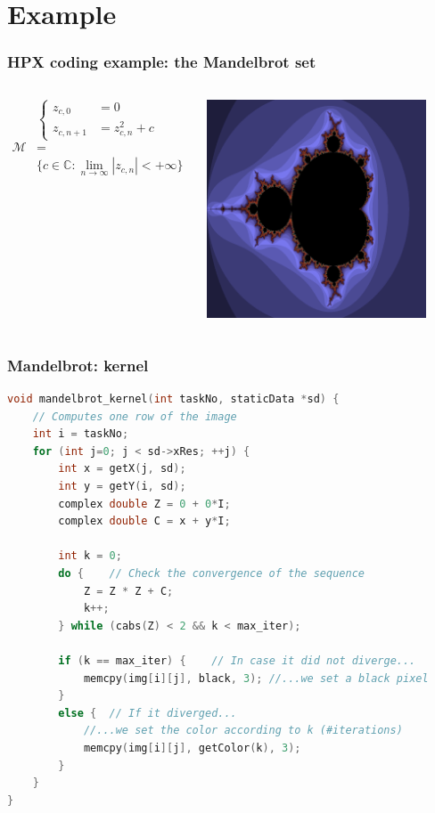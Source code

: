 \documentclass[compress]{beamer}
\begin{document}
\section{Example}
\begin{frame}
	\frametitle{HPX coding example: the Mandelbrot set}
	\begin{columns}
		\column{\dimexpr\linewidth-65mm-2mm}
		\pause
		\begin{equation*}
			\begin{cases}
				z_{c,0} &= 0 \\
				z_{c,n+1} &= z_{c,n}^2 + c
			\end{cases}
		\end{equation*}
		\pause
		\begin{align*}
			\mathcal{M} & = \\
			& \{c\in\mathbb{C} : \lim_{n\to\infty} |z_{c,n}| < +\infty \}
		\end{align*}
		\column{65mm}
		\begin{center}
			\includegraphics[width=65mm]{Figures/mandelbrot.png}
		\end{center}
	\end{columns}
\end{frame}

\begin{frame}[fragile]
	\frametitle{Mandelbrot: kernel}
\begin{lstlisting}[language=C]
void mandelbrot_kernel(int taskNo, staticData *sd) {
	// Computes one row of the image
	int i = taskNo;
	for (int j=0; j < sd->xRes; ++j) {
		int x = getX(j, sd);
		int y = getY(i, sd);
		complex double Z = 0 + 0*I;
		complex double C = x + y*I;
		
		int k = 0;
		do {	// Check the convergence of the sequence
			Z = Z * Z + C;
			k++;
		} while (cabs(Z) < 2 && k < max_iter);

		if (k == max_iter) {	// In case it did not diverge...
			memcpy(img[i][j], black, 3); //...we set a black pixel
		}
		else {	// If it diverged...
			//...we set the color according to k (#iterations)
			memcpy(img[i][j], getColor(k), 3);
		}
	}
}
\end{lstlisting}
\end{frame}
\end{document}
